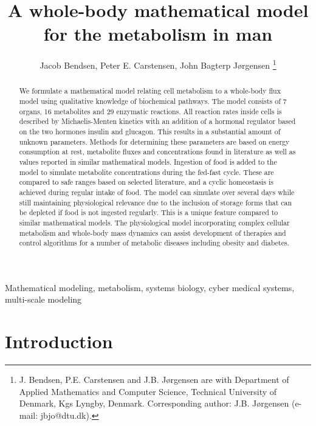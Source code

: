 \documentclass{IEEEtran}
\begin{document}
\title{A whole-body mathematical model for the metabolism in man}

\author{Jacob Bendsen, Peter E. Carstensen, John Bagterp Jørgensen
\thanks{J. Bendsen, P.E. Carstensen and J.B. J{\o}rgensen are with Department of Applied Mathematics and Computer Science, Technical University of Denmark, Kgs Lyngby, Denmark. Corresponding author: J.B. J{\o}rgensen (e-mail: jbjo@dtu.dk).}
}

\maketitle

\begin{abstract}
We formulate a mathematical model relating cell metabolism to a whole-body flux model using qualitative knowledge of biochemical pathways. The model consists of 7 organs, 16 metabolites and 29 enzymatic reactions. All reaction rates inside cells is described by Michaelis-Menten kinetics with an addition of a hormonal regulator based on the two hormones insulin and glucagon. This results in a substantial amount of unknown parameters. Methods for determining these parameters are based on energy consumption at rest, metabolite fluxes and concentrations found in literature as well as values reported in similar mathematical models. Ingestion of food is added to the model to simulate metabolite concentrations during the fed-fast cycle. These are compared to safe ranges based on selected literature, and a cyclic homeostasis is achieved during regular intake of food. The model can simulate over several days while still maintaining physiological relevance due to the inclusion of storage forms that can be depleted if food is not ingested regularly. This is a unique feature compared to similar mathematical models. The physiological model incorporating complex cellular metabolism and whole-body mass dynamics can assist development of therapies and control algorithms for a number of metabolic diseases including obesity and diabetes.
\end{abstract}

\begin{IEEEkeywords}
Mathematical modeling, metabolism, systems biology, cyber medical systems, multi-scale modeling
\end{IEEEkeywords}

\section{Introduction}
\label{sec:introduction}
\end{document}
